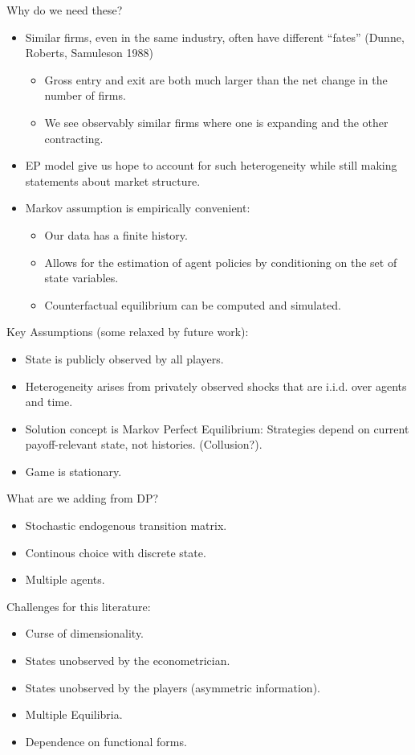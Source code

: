 \documentclass[twoside]{article}
\begin{document}
Why do we need these?
\begin{itemize}
\item Similar firms, even in the same industry, often have different ``fates'' (Dunne, Roberts, Samuleson 1988)
\begin{itemize}
\item Gross entry and exit are both much larger than the net change in the number of firms. 
\item We see observably similar firms where one is expanding and the other contracting. 
\end{itemize}
\item EP model give us hope to account for such heterogeneity while still making statements about market structure. 
\item Markov assumption is empirically convenient: 
\begin{itemize}
\item Our data has a finite history. 
\item Allows for the estimation of agent policies by conditioning on the set of state variables. 
\item Counterfactual equilibrium can be computed and simulated. 
\end{itemize} 
\end{itemize}
 
Key Assumptions (some relaxed by future work):
\begin{itemize}
\item State is publicly observed by all players. 
\item Heterogeneity arises from privately observed shocks that are i.i.d. over agents and time.
\item Solution concept is Markov Perfect Equilibrium: Strategies depend on current payoff-relevant state, not histories. (Collusion?). 
\item Game is stationary. 
\end{itemize}

What are we adding from DP? 
\begin{itemize}
\item Stochastic endogenous transition matrix. 
\item Continous choice with discrete state. 
\item Multiple agents. 
\end{itemize}
 
 Challenges for this literature: 
 \begin{itemize}
 \item Curse of dimensionality. 
 \item States unobserved by the econometrician. 
 \item States unobserved by the players (asymmetric information). 
 \item Multiple Equilibria. 
 \item Dependence on functional forms. 
 \end{itemize}
 
\end{document}
